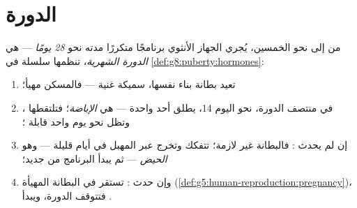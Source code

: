 \section{الدورة}

\begin{proposition}\label{prop:g8:reproductive-systems:cycle}
من  إلى نحو الخمسين، يُجري الجهاز الأنثوي برنامجًا
متكررًا مدته نحو \emph{28 يومًا} --- هي \emph{الدورة
الشهرية}، تنظمها سلسلة  في
\cref{def:g8:puberty:hormones}:
\begin{enumerate}
  \item تعيد بطانة  بناء نفسها، سميكة غنية  ---
        فالمسكن مهيأ؛
  \item في منتصف الدورة، نحو اليوم 14، يطلق أحد 
         واحدة --- هي \emph{الإباضة}؛
        فتلتقطها ، وتظل نحو يوم واحد قابلة
        ؛
  \item إن لم يحدث : فالبطانة غير لازمة؛ تتفكك وتخرج
        عبر المهبل في أيام قليلة --- وهو \emph{الحيض}
        --- ثم يبدأ البرنامج من جديد؛
  \item وإن حدث : تستقر  في البطانة المهيأة
        (\cref{def:g5:human-reproduction:pregnancy})،
        فتتوقف الدورة، ويبدأ .
\end{enumerate}
\end{proposition}
\admitted

